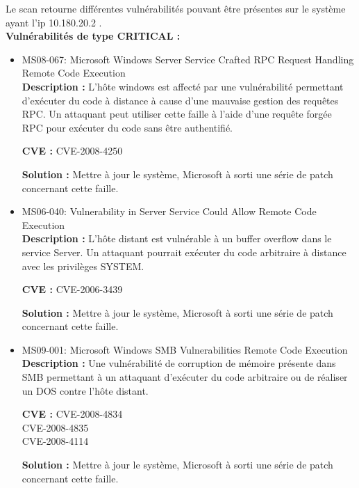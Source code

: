 \documentclass[french,paper=a4,oneside,captions=tableheading]{article}
\begin{document}
Le scan retourne différentes vulnérabilités pouvant être présentes sur le système ayant l'ip 10.180.20.2 . \\

\textbf{Vulnérabilités de type CRITICAL :}
\begin{itemize}
    \item MS08-067: Microsoft Windows Server Service Crafted RPC Request
Handling Remote Code Execution\\
\textbf{Description :}
L'hôte windows est affecté par une vulnérabilité permettant d'exécuter du code à distance à cause d'une mauvaise gestion des requêtes RPC. Un attaquant peut utiliser cette faille à l'aide d'une requête forgée RPC pour exécuter du code sans être authentifié.

\textbf{CVE :}
CVE-2008-4250

\textbf{Solution :}
Mettre à jour le système, Microsoft à sorti une série de patch concernant cette faille.\\

\item MS06-040: Vulnerability in Server Service Could Allow Remote Code
Execution \\
\textbf{Description :}
L'hôte distant est vulnérable à un buffer overflow dans le service Server. Un attaquant pourrait exécuter du code arbitraire à distance avec les privilèges SYSTEM.

\textbf{CVE :}
CVE-2006-3439

\textbf{Solution :}
Mettre à jour le système, Microsoft à sorti une série de patch concernant cette faille.\\

\item MS09-001: Microsoft Windows SMB Vulnerabilities Remote Code Execution \\
\textbf{Description :}
Une vulnérabilité de corruption de mémoire présente dans SMB permettant à un attaquant d'exécuter du code arbitraire ou de réaliser un DOS contre l'hôte distant.

\textbf{CVE :}
CVE-2008-4834 \\
CVE-2008-4835 \\
CVE-2008-4114

\textbf{Solution :}
Mettre à jour le système, Microsoft à sorti une série de patch concernant cette faille.\\
\end{itemize}
\end{document}
